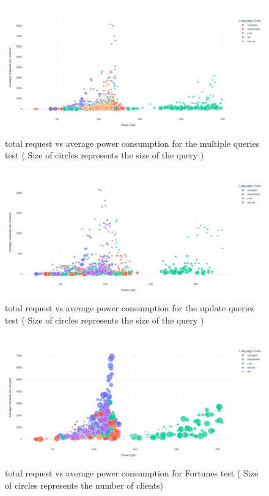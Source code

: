 \begin{figure}[bht]
    \centering
    \includegraphics[width=
        \columnwidth]{imgs/power_requests_query}
    \caption{total request vs average power consumption for the multiple queries test ( Size of circles represents the size of the query )}
    \label{fig:power_requests_query}
\end{figure}
\begin{figure}[bht]
    \centering
    \includegraphics[width=
        \columnwidth]{imgs/power_requests_update}
    \caption{total request vs average power consumption for the update queries test ( Size of circles represents the size of the query )}
    \label{fig:power_requests_update}
\end{figure}
\begin{figure}[bht]
    \centering
    \includegraphics[width=
        \columnwidth]{imgs/power_requests_fortune}
    \caption{total request vs average power consumption for Fortunes test ( Size of circles represents the number of clients)}
    \label{fig:power_requests_fortune}
\end{figure}
